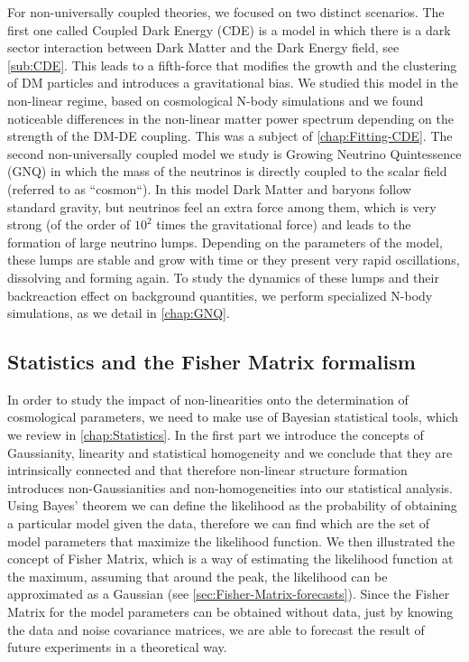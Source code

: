 For non-universally coupled theories, we focused on two distinct scenarios. The first one called Coupled Dark Energy
(CDE) is a model in which there is a dark sector interaction between Dark Matter and the Dark Energy field, see \cref{sub:CDE}. This leads to a fifth-force that modifies the growth and the clustering of DM particles and introduces a gravitational bias.
We studied this model in the non-linear regime, based on cosmological N-body simulations and we found
noticeable differences in the non-linear matter power spectrum depending on the strength of the DM-DE coupling. This was a subject of \cref{chap:Fitting-CDE}.
The second non-universally coupled model we study is Growing Neutrino Quintessence (GNQ) in which
the mass of the neutrinos is directly coupled to the scalar field (referred to as ``cosmon``).
In this model Dark Matter and baryons follow standard gravity, but neutrinos feel an extra force among them, which
is very strong (of the order of $10^2$ times the gravitational force) and leads to the formation of large neutrino lumps. Depending on the parameters of the model, these lumps are stable and grow with time
or they present very rapid oscillations, dissolving and forming again. To study the dynamics of these lumps
and their backreaction effect on background quantities, we perform specialized N-body simulations, as we 
detail in \cref{chap:GNQ}. 

\subsection*{Statistics and the Fisher Matrix formalism}

In order to study the impact of non-linearities onto the determination of cosmological parameters,
we need to make use of Bayesian statistical tools, which we review in \cref{chap:Statistics}. 
In the first part we introduce the concepts of Gaussianity, linearity and statistical homogeneity and 
we conclude that they are intrinsically connected and that therefore non-linear structure formation
introduces non-Gaussianities and non-homogeneities into our statistical analysis.
Using Bayes' theorem we can define the likelihood as the probability of obtaining a particular model given the data, therefore
we can find which are the set of model parameters that maximize the likelihood function.
We then illustrated the concept of Fisher Matrix, which is a way of estimating the likelihood function at the maximum, 
assuming that around the peak, the likelihood can be approximated as a Gaussian (see \cref{sec:Fisher-Matrix-forecasts}).
Since the Fisher Matrix for the model parameters can be obtained without data, just by knowing the data and noise covariance matrices,
we are able to forecast the result of future experiments in a theoretical way.

